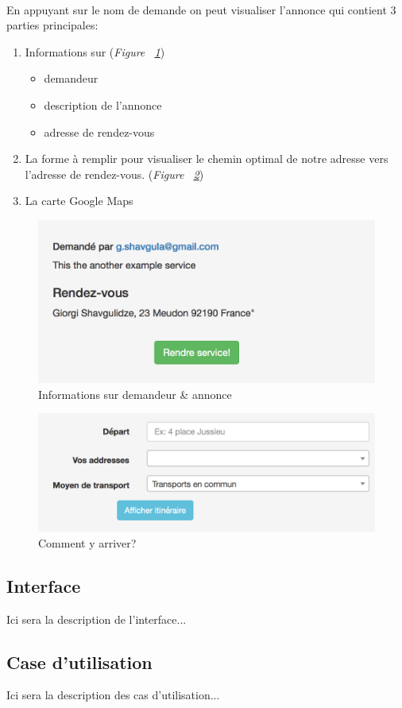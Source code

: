 \paragraph{}
En appuyant sur le nom de demande on peut visualiser l'annonce qui contient 3 parties principales: 
\begin{enumerate}
	\item Informations sur (\textit{Figure ~\ref{fig:infoannonce}})
	\begin{itemize}
		\item demandeur
		\item description de l'annonce
		\item adresse de rendez-vous
	\end{itemize}
	\item La forme à remplir pour visualiser le chemin optimal de notre adresse vers l'adresse de rendez-vous.  (\textit{Figure ~\ref{fig:formeadresse}})
	\item La carte Google Maps
\end{enumerate}

\begin{figure}[H]
	\includegraphics[width=1\textwidth]{images/manuel/demandeur}
	\caption{Informations sur demandeur \& annonce }
	\label{fig:infoannonce}
\end{figure}
\begin{figure}[H]
	\includegraphics[width=1\textwidth]{images/manuel/adresse}
	\caption{Comment y arriver? \label{overflow}}
	\label{fig:formeadresse}
\end{figure}

\pagebreak

\subsection{Interface}
Ici sera la description de l'interface...
\subsection{Case d'utilisation}
Ici sera la description des cas d'utilisation...
